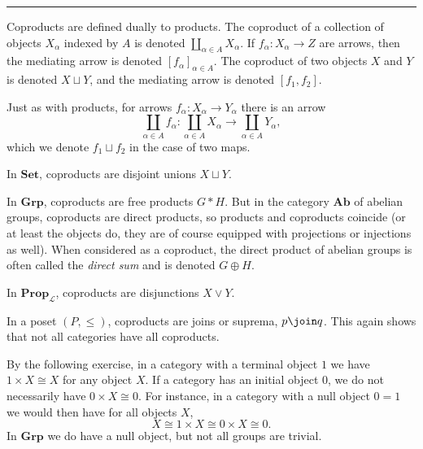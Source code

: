 \documentclass[article, a4paper, 11pt, oneside]{memoir}
\numberwithin{equation}{chapter}
\newcommand{\calL}{\mathcal{L}}
\newcommand{\ncat}[1]{\mathbf{#1}} %
\newcommand{\catSet}{\ncat{Set}}
\newcommand{\catGrp}{\ncat{Grp}}
\newcommand{\catAb}{\ncat{Ab}}
\newcommand{\catProp}{\ncat{Prop}}
\let\oldcoprod\coprod
\newcommand{\bigcoprod}{\oldcoprod}
\renewcommand{\coprod}{\sqcup}
\newcommand{\freeprod}{*} %
\newcommand{\dirsum}{\oplus}
\theoremstyle{myexample}
\theoremstyle{myexamplebreak}
\newcommand\fleuronbreak{\fancybreak{\textcolor{linkcolor}{\adfhangingflatleafleft}}}
\begin{document}
\fleuronbreak

Coproducts are defined dually to products. The coproduct of a collection of objects $X_\alpha$ indexed by $A$ is denoted $\bigcoprod_{\alpha \in A} X_\alpha$. If $f_\alpha \colon X_\alpha \to Z$ are arrows, then the mediating arrow is denoted $[f_\alpha]_{\alpha \in A}$. The coproduct of two objects $X$ and $Y$ is denoted $X \coprod Y$, and the mediating arrow is denoted $[f_1, f_2]$.

Just as with products, for arrows $f_\alpha \colon X_\alpha \to Y_\alpha$ there is an arrow
%
\begin{equation*}
    \bigcoprod_{\alpha \in A} f_\alpha
        \colon \bigcoprod_{\alpha \in A} X_\alpha
        \to \bigcoprod_{\alpha \in A} Y_\alpha,
\end{equation*}
%
which we denote $f_1 \coprod f_2$ in the case of two maps.

\begin{examplebreak}
    \begin{enumexample}
        \item In $\catSet$, coproducts are disjoint unions $X \coprod Y$.
        
        \item In $\catGrp$, coproducts are free products $G \freeprod H$. But in the category $\catAb$ of abelian groups, coproducts are direct products, so products and coproducts coincide (or at least the objects do, they are of course equipped with projections or injections as well). When considered as a coproduct, the direct product of abelian groups is often called the \emph{direct sum} and is denoted $G \dirsum H$.
        
        \item In $\catProp_\calL$, coproducts are disjunctions $X \lor Y$.
        
        \item In a poset $(P, \leq)$, coproducts are joins or suprema, $p \join q$. This again shows that not all categories have all coproducts.
    \end{enumexample}
\end{examplebreak}


\begin{remark}
    By the following exercise, in a category with a terminal object $1$ we have $1 \times X \cong X$ for any object $X$. If a category has an initial object $0$, we do not necessarily have $0 \times X \cong 0$. For instance, in a category with a null object $0 = 1$ we would then have for all objects $X$,
    \begin{equation*}
        X
            \cong 1 \times X
            \cong 0 \times X
            \cong 0.
    \end{equation*}
    In $\catGrp$ we do have a null object, but not all groups are trivial.
\end{remark}
\end{document}
